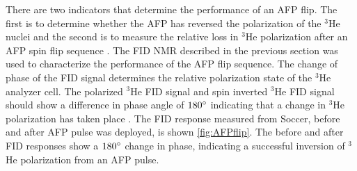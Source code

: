 

There are two indicators that determine the performance of an AFP flip. The first is to determine whether the AFP has reversed the polarization of the $^3$He nuclei and the second is to measure the relative loss in $^3$He polarization after an AFP spin flip sequence \cite{McKetterick2011, Parnell2008}. The FID NMR described in the previous section was used to characterize the performance of the AFP flip sequence. The change of phase of the FID signal determines the relative polarization state of the $^3$He analyzer cell. The polarized $^3$He FID signal and spin inverted $^3$He FID signal should show a difference in phase angle of $180 \degree $ indicating that a change in $^3$He polarization has taken place \cite{Parnell2008, Parnell2011}. The FID response measured from Soccer, before and after AFP pulse was deployed, is shown \cref{fig:AFPflip}. The before and after FID responses show a $180 \degree $ change in phase, indicating a successful inversion of $^3$He polarization from an AFP pulse.

